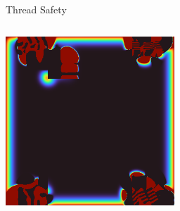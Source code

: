 \begin{frame}{Thread Safety}
\begin{columns}
\begin{center}
  \vspace{0.1cm}

  \includegraphics[width=0.6\textwidth]{glitch_04.png}
  \end{center}
\end{columns}
\end{frame}
\placelogotrue
